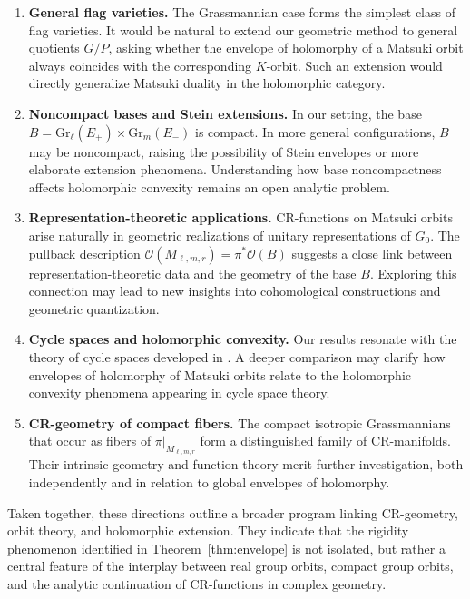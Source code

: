 \documentclass[12pt,a4paper]{article}
\theoremstyle{plain}
\theoremstyle{definition}
\theoremstyle{remark}
\begin{document}
\begin{enumerate}
    \item \textbf{General flag varieties.}  
    The Grassmannian case forms the simplest class of flag varieties. 
    It would be natural to extend our geometric method to general 
    quotients $G/P$, asking whether the envelope of holomorphy of a 
    Matsuki orbit always coincides with the corresponding $K$-orbit. 
    Such an extension would directly generalize Matsuki duality in 
    the holomorphic category. 

    \item \textbf{Noncompact bases and Stein extensions.}  
    In our setting, the base $B = \mathrm{Gr}_\ell(E_+) \times \mathrm{Gr}_m(E_-)$ 
    is compact. 
    In more general configurations, $B$ may be noncompact, raising the 
    possibility of Stein envelopes or more elaborate extension phenomena. 
    Understanding how base noncompactness affects holomorphic convexity 
    remains an open analytic problem. 

    \item \textbf{Representation-theoretic applications.}  
    CR-functions on Matsuki orbits arise naturally in geometric 
    realizations of unitary representations of $G_0$. 
    The pullback description 
    $\mathcal{O}(M_{\ell,m,r}) = \pi^\ast \mathcal{O}(B)$ 
    suggests a close link between representation-theoretic data and the 
    geometry of the base $B$. 
    Exploring this connection may lead to new insights into cohomological 
    constructions and geometric quantization. 

    \item \textbf{Cycle spaces and holomorphic convexity.}  
    Our results resonate with the theory of cycle spaces developed in 
    \cite{FelsHuckleberryWolf2006}. 
    A deeper comparison may clarify how envelopes of holomorphy of 
    Matsuki orbits relate to the holomorphic convexity phenomena 
    appearing in cycle space theory. 

    \item \textbf{CR-geometry of compact fibers.}  
    The compact isotropic Grassmannians that occur as fibers of 
    $\pi|_{M_{\ell,m,r}}$ form a distinguished family of CR-manifolds. 
    Their intrinsic geometry and function theory merit further 
    investigation, both independently and in relation to global 
    envelopes of holomorphy. 
\end{enumerate}

Taken together, these directions outline a broader program linking 
CR-geometry, orbit theory, and holomorphic extension. 
They indicate that the rigidity phenomenon identified in 
Theorem~\ref{thm:envelope} is not isolated, but rather a central feature 
of the interplay between real group orbits, compact group orbits, and 
the analytic continuation of CR-functions in complex geometry. 
\end{document}
